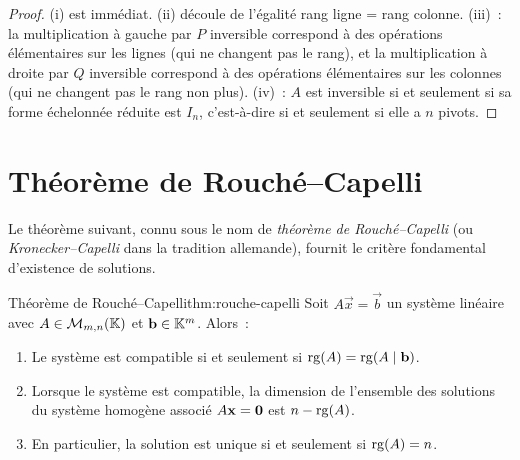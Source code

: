 \begin{proof}
  (i) est immédiat. (ii) découle de l'égalité rang ligne = rang colonne.
  (iii)~: la multiplication à gauche par $P$ inversible correspond à des
  opérations élémentaires sur les lignes (qui ne changent pas le rang), et
  la multiplication à droite par $Q$ inversible correspond à des opérations
  élémentaires sur les colonnes (qui ne changent pas le rang non plus).
  (iv)~: $A$ est inversible si et seulement si sa forme échelonnée réduite
  est $I_n$, c'est-à-dire si et seulement si elle a $n$ pivots.
\end{proof}

\section{Théorème de Rouché--Capelli}\label{sec:rouche-capelli}

Le théorème suivant, connu sous le nom de \emph{théorème de
Rouché--Capelli} (ou
\emph{Kronecker--Capelli} dans
la tradition allemande), fournit le critère fondamental d'existence de
solutions.

\begin{theorem}{Théorème de Rouché--Capelli}{thm:rouche-capelli}
  Soit $A\vec{x}=\vec{b}$ un système linéaire avec $A\in\mathcal{M}_{m,n}({\mathbb{K}})$
  et $\mathbf{b}\in{\mathbb{K}}^m$. Alors~:
  \begin{enumerate}[label=(\roman*)]
    \item Le système est compatible si et seulement si
      $\operatorname{rg}(A)=\operatorname{rg}(A\mid\mathbf{b})$.
    \item Lorsque le système est compatible, la dimension de l'ensemble des
      solutions du système homogène associé $A\mathbf{x}=\mathbf{0}$ est
      $n-\operatorname{rg}(A)$.
    \item En particulier, la solution est unique si et seulement si
      $\operatorname{rg}(A)=n$.
  \end{enumerate}
\end{theorem}

